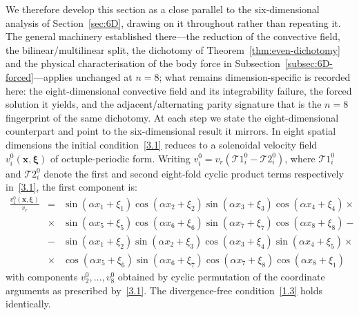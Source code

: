 \documentclass[11pt]{jfm}
\numberwithin{equation}{section}
\begin{document}
We therefore develop this section as a close parallel to the six-dimensional
analysis of Section~\ref{sec:6D}, drawing on it throughout rather than repeating it. The general
machinery established there---the reduction of the convective field, the bilinear/multilinear
split, the dichotomy of Theorem~\ref{thm:even-dichotomy} and the physical characterisation of the
body force in Subsection~\ref{subsec:6D-forced}---applies unchanged at $n=8$; what remains
dimension-specific is recorded here: the eight-dimensional convective field and its integrability
failure, the forced solution it yields, and the adjacent/alternating parity signature that is the
$n=8$ fingerprint of the same dichotomy. At each step we state the eight-dimensional counterpart
and point to the six-dimensional result it mirrors.
In eight spatial dimensions the initial condition~\eqref{3.1} reduces to a solenoidal velocity
field $v_i^0(\boldsymbol{x},\boldsymbol{\xi})$ of octuple-periodic form. Writing
$v_i^0 = v_r(\mathcal{T}1_i^0 - \mathcal{T}2_i^0)$, where $\mathcal{T}1_i^0$ and $\mathcal{T}2_i^0$ denote the first and second
eight-fold cyclic product terms respectively in~\eqref{3.1}, the first component is:
\begin{eqnarray}
\label{8.1}
\frac{v_1^0(\boldsymbol{x}, \boldsymbol{\xi})}{v_r}&=&
\sin(\alpha x_1\!+\!\xi_1)\cos(\alpha x_2\!+\!\xi_2)\sin(\alpha x_3\!+\!\xi_3)
\cos(\alpha x_4\!+\!\xi_4)\times\nonumber\\
&\times&\sin(\alpha x_5\!+\!\xi_5)\cos(\alpha x_6\!+\!\xi_6)\sin(\alpha x_7\!+\!\xi_7)
\cos(\alpha x_8\!+\!\xi_8)- \nonumber\\
&-&\sin(\alpha x_1\!+\!\xi_2)\sin(\alpha x_2\!+\!\xi_3)\cos(\alpha x_3\!+\!\xi_4)
\sin(\alpha x_4\!+\!\xi_5)\times\nonumber\\
&\times&\cos(\alpha x_5\!+\!\xi_6)\sin(\alpha x_6\!+\!\xi_7)\cos(\alpha x_7\!+\!\xi_8)
\cos(\alpha x_8\!+\!\xi_1)
\end{eqnarray}
with components $v_2^0,\ldots,v_8^0$ obtained by cyclic permutation of the coordinate arguments
as prescribed by~\eqref{3.1}. The divergence-free condition~\eqref{1.3} holds identically.
\end{document}
